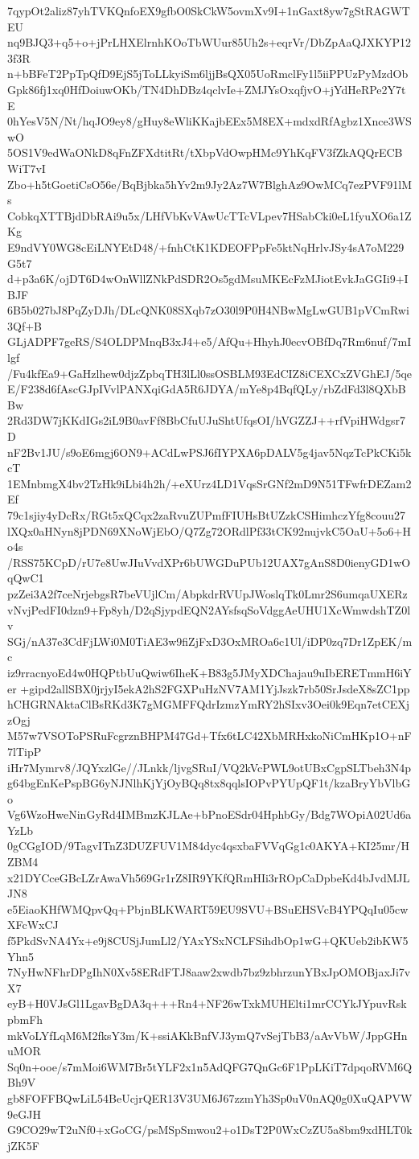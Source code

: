 7qypOt2aliz87yhTVKQnfoEX9gfbO0SkCkW5ovmXv9I+1nGaxt8yw7gStRAGWTEU
nq9BJQ3+q5+o+jPrLHXElrnhKOoTbWUur85Uh2s+eqrVr/DbZpAaQJXKYP123f3R
n+bBFeT2PpTpQfD9EjS5jToLLkyiSm6ljjBsQX05UoRmclFy1l5iiPPUzPyMzdOb
Gpk86fj1xq0HfDoiuwOKb/TN4DhDBz4qclvIe+ZMJYsOxqfjvO+jYdHeRPe2Y7tE
0hYesV5N/Nt/hqJO9ey8/gHuy8eWliKKajbEEx5M8EX+mdxdRfAgbz1Xnce3WSwO
5OS1V9edWaONkD8qFnZFXdtitRt/tXbpVdOwpHMc9YhKqFV3fZkAQQrECBWiT7vI
Zbo+h5tGoetiCsO56e/BqBjbka5hYv2m9Jy2Az7W7BlghAz9OwMCq7ezPVF91lMs
CobkqXTTBjdDbRAi9u5x/LHfVbKvVAwUcTTcVLpev7HSabCki0eL1fyuXO6a1ZKg
E9ndVY0WG8cEiLNYEtD48/+fnhCtK1KDEOFPpFe5ktNqHrlvJSy4sA7oM229G5t7
d+p3a6K/ojDT6D4wOnWllZNkPdSDR2Os5gdMsuMKEcFzMJiotEvkJaGGIi9+IBJF
6B5b027bJ8PqZyDJh/DLcQNK08SXqb7zO30l9P0H4NBwMgLwGUB1pVCmRwi3Qf+B
GLjADPF7geRS/S4OLDPMnqB3xJ4+e5/AfQu+HhyhJ0ecvOBfDq7Rm6nuf/7mIlgf
/Fu4kfEa9+GaHzlhew0djzZpbqTH3lLl0ssOSBLM93EdCIZ8iCEXCxZVGhEJ/5qe
E/F238d6fAscGJpIVvlPANXqiGdA5R6JDYA/mYe8p4BqfQLy/rbZdFd3l8QXbBBw
2Rd3DW7jKKdIGs2iL9B0avFf8BbCfuUJuShtUfqsOI/hVGZZJ++rfVpiHWdgsr7D
nF2Bv1JU/s9oE6mgj6ON9+ACdLwPSJ6fIYPXA6pDALV5g4jav5NqzTcPkCKi5kcT
1EMnbmgX4bv2TzHk9iLbi4h2h/+eXUrz4LD1VqsSrGNf2mD9N51TFwfrDEZam2Ef
79c1sjiy4yDcRx/RGt5xQCqx2zaRvuZUPmfFIUHsBtUZzkCSHimhczYfg8couu27
lXQx0aHNyn8jPDN69XNoWjEbO/Q7Zg72ORdlPf33tCK92nujvkC5OaU+5o6+Ho4s
/RSS75KCpD/rU7e8UwJIuVvdXPr6bUWGDuPUb12UAX7gAnS8D0ienyGD1wOqQwC1
pzZei3A2f7ceNrjebgsR7beVUjlCm/AbpkdrRVUpJWoslqTk0Lmr2S6umqaUXERz
vNvjPedFI0dzn9+Fp8yh/D2qSjypdEQN2AYsfsqSoVdggAeUHU1XcWmwdshTZ0lv
SGj/nA37e3CdFjLWi0M0TiAE3w9fiZjFxD3OxMROa6c1Ul/iDP0zq7Dr1ZpEK/mc
iz9rracnyoEd4w0HQPtbUuQwiw6IheK+B83g5JMyXDChajau9uIbERETmmH6iYer
+gipd2allSBX0jrjyI5ekA2hS2FGXPuHzNV7AM1YjJszk7rb50SrJsdeX8sZC1pp
hCHGRNAktaClBsRKd3K7gMGMFFQdrIzmzYmRY2hSIxv3Oei0k9Eqn7etCEXjzOgj
M57w7VSOToPSRuFcgrznBHPM47Gd+Tfx6tLC42XbMRHxkoNiCmHKp1O+nF7lTipP
iHr7Mymrv8/JQYxzlGe//JLnkk/ljvgSRuI/VQ2kVcPWL9otUBxCgpSLTbeh3N4p
g64bgEnKePspBG6yNJNlhKjYjOyBQq8tx8qqlsIOPvPYUpQF1t/kzaBryYbVlbGo
Vg6WzoHweNinGyRd4IMBmzKJLAe+bPnoESdr04HphbGy/Bdg7WOpiA02Ud6aYzLb
0gCGgIOD/9TagvITnZ3DUZFUV1M84dyc4qsxbaFVVqGg1c0AKYA+KI25mr/HZBM4
x21DYCceGBcLZrAwaVh569Gr1rZ8IR9YKfQRmHIi3rROpCaDpbeKd4bJvdMJLJN8
e5EiaoKHfWMQpvQq+PbjnBLKWART59EU9SVU+BSuEHSVcB4YPQqIu05cwXFcWxCJ
f5PkdSvNA4Yx+e9j8CUSjJumLl2/YAxYSxNCLFSihdbOp1wG+QKUeb2ibKW5Yhn5
7NyHwNFhrDPgIhN0Xv58ERdFTJ8aaw2xwdb7bz9zbhrzunYBxJpOMOBjaxJi7vX7
eyB+H0VJsGl1LgavBgDA3q+++Rn4+NF26wTxkMUHElti1mrCCYkJYpuvRskpbmFh
mkVoLYfLqM6M2fksY3m/K+ssiAKkBnfVJ3ymQ7vSejTbB3/aAvVbW/JppGHnuMOR
Sq0n+ooe/s7mMoi6WM7Br5tYLF2x1n5AdQFG7QnGc6F1PpLKiT7dpqoRVM6QBh9V
gb8FOFFBQwLiL54BeUcjrQER13V3UM6J67zzmYh3Sp0uV0nAQ0g0XuQAPVW9eGJH
G9CO29wT2uNf0+xGoCG/psMSpSmwou2+o1DsT2P0WxCzZU5a8bm9xdHLT0kjZK5F
